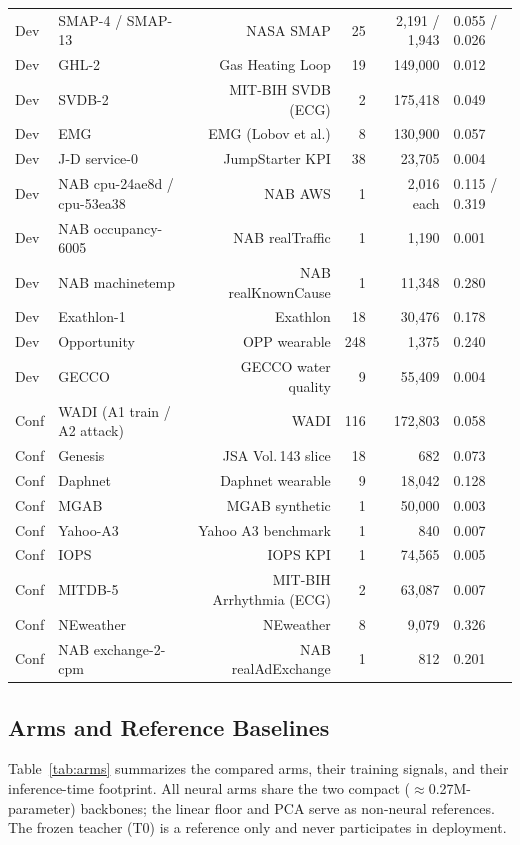 \begin{table}[t]
\begin{tabular}{p{1.3cm}p{2.55cm}rrrp{0.9cm}}
Dev & SMAP-4 / SMAP-13 & NASA SMAP & 25 & 2{,}191 / 1{,}943 & 0.055 / 0.026 \\
Dev & GHL-2 & Gas Heating Loop & 19 & 149{,}000 & 0.012 \\
Dev & SVDB-2 & MIT-BIH SVDB (ECG) & 2 & 175{,}418 & 0.049 \\
Dev & EMG & EMG (Lobov et al.) & 8 & 130{,}900 & 0.057 \\
Dev & J-D service-0 & JumpStarter KPI & 38 & 23{,}705 & 0.004 \\
Dev & NAB cpu-24ae8d / cpu-53ea38 & NAB AWS & 1 & 2{,}016 each & 0.115 / 0.319 \\
Dev & NAB occupancy-6005 & NAB realTraffic & 1 & 1{,}190 & 0.001 \\
Dev & NAB machine\-temp & NAB realKnownCause & 1 & 11{,}348 & 0.280 \\
Dev & Exathlon-1 & Exathlon & 18 & 30{,}476 & 0.178 \\
Dev & Opportunity & OPP wearable & 248 & 1{,}375 & 0.240 \\
Dev & GECCO & GECCO water quality & 9 & 55{,}409 & 0.004 \\
\midrule
Conf & WADI (A1 train / A2 attack) & WADI & 116 & 172{,}803 & 0.058 \\
Conf & Genesis & JSA Vol.\,143 slice & 18 & 682 & 0.073 \\
Conf & Daphnet & Daphnet wearable & 9 & 18{,}042 & 0.128 \\
Conf & MGAB & MGAB synthetic & 1 & 50{,}000 & 0.003 \\
Conf & Yahoo-A3 & Yahoo A3 benchmark & 1 & 840 & 0.007 \\
Conf & IOPS & IOPS KPI & 1 & 74{,}565 & 0.005 \\
Conf & MITDB-5 & MIT-BIH Arrhythmia (ECG) & 2 & 63{,}087 & 0.007 \\
Conf & NEweather & NEweather & 8 & 9{,}079 & 0.326 \\
Conf & NAB exchange-2-cpm & NAB realAdExchange & 1 & 812 & 0.201 \\
\bottomrule
\end{tabular}
\end{table}

\subsection{Arms and Reference Baselines}\label{sec:setup-arms}
Table~\ref{tab:arms} summarizes the compared arms, their training
signals, and their inference-time footprint. All neural arms share the
two compact ($\approx$0.27M-parameter) backbones; the linear floor and PCA serve as
non-neural references. The frozen teacher (T0) is a reference only and
never participates in deployment.

